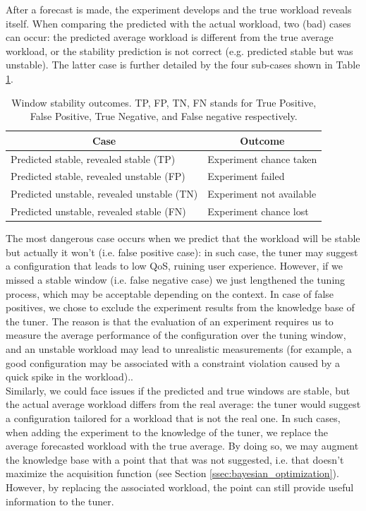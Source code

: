 \documentclass[a4paper, 12pt]{article} %
\newcommand{\ra}[1]{\renewcommand{\arraystretch}{#1}}
\begin{document}
	After a forecast is made, the experiment develops and the true workload reveals itself. When comparing the predicted with the actual workload, two (bad) cases can occur: the predicted average workload is different from the true average workload, or the stability prediction is not correct (e.g. predicted stable but was unstable). The latter case is further detailed by the four sub-cases shown in Table \ref{table:stability_cases}. 	 
	\begin{table}
		\ra{1.3}
		\begin{tabular*}{\textwidth}{l l}
			\toprule
			\multicolumn{1}{c}{Case} & \multicolumn{1}{c}{Outcome}\\
			\midrule
			Predicted stable, revealed stable (TP) & Experiment chance taken\\
			Predicted stable, revealed unstable (FP)& Experiment failed\\
			Predicted unstable, revealed unstable (TN)& Experiment not available\\
			Predicted unstable, revealed stable (FN)& Experiment chance lost\\
			\bottomrule
		\end{tabular*}
		\caption{Window stability outcomes. TP, FP, TN, FN stands for True Positive, False Positive, True Negative, and False negative respectively.} \label{table:stability_cases}
	\end{table}
	The most dangerous case occurs when we predict that the workload will be stable but actually it won't (i.e. false positive case): in such case, the tuner may suggest a configuration that leads to low QoS, ruining user experience. However, if we missed a stable window (i.e. false negative case) we just lengthened the tuning process, which may be acceptable depending on the context.
	In case of false positives, we chose to exclude the experiment results from the knowledge base of the tuner. The reason is that the evaluation of an experiment requires us to measure the average performance of the configuration over the tuning window, and an unstable workload may lead to unrealistic measurements (for example, a good configuration may be associated with a constraint violation caused by a quick spike in the workload)..\\
	Similarly, we could face issues if the predicted and true windows are stable, but the actual average workload differs from the real average: the tuner would suggest a configuration tailored for a workload that is not the real one. In such cases, when adding the experiment to the knowledge of the tuner, we replace the average forecasted workload with the true average. By doing so, we may augment the knowledge base with a point that that was not suggested, i.e. that doesn't maximize the acquisition function (see Section \ref{ssec:bayesian_optimization}). However, by replacing the associated workload, the point can still provide useful information to the tuner.
	
\end{document}
